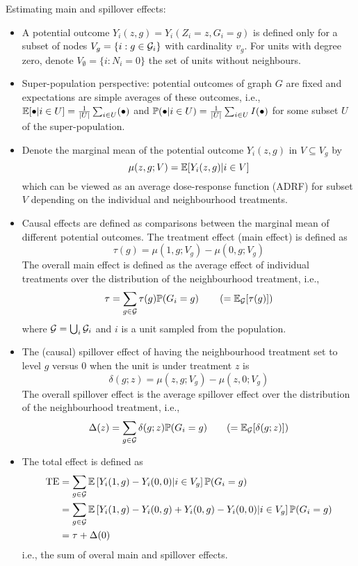 \documentclass[10pt]{article}
\begin{document}
Estimating main and spillover effects:

\begin{itemize}

\item
A potential outcome $Y_i(z,g)=Y_i(Z_i=z,G_i=g)$ is defined only for a subset of nodes $V_g=\{i:g\in\calG_i\}$ with cardinality $v_g$. For units with degree zero, denote $V_{\emptyset}=\{i:N_i=0\}$ the set of units without neighbours.

\item
Super-population perspective: potential outcomes of graph $G$ are fixed and expectations are simple averages of these outcomes, i.e., $\E[\bullet|i\in U]=\frac{1}{|U|}\sum_{i\in U}(\bullet)$ and $\P(\bullet|i\in U)=\frac{1}{|U|}\sum_{i\in U}I(\bullet)$ for some subset $U$ of the super-population.

\item
Denote the marginal mean of the potential outcome $Y_i(z,g)$ in $V\subseteq V_g$ by
\[
\mu(z,g;V) = \E[Y_i(z,g)|i\in V]
\]
which can be viewed as an average dose-response function (ADRF) for subset $V$ depending on the individual and neighbourhood treatments.

\item
Causal effects are defined as comparisons between the marginal mean of different potential outcomes. The treatment effect (main effect) is defined as
\[
\tau(g) = \mu(1,g;V_g) - \mu(0,g;V_g)
\]
The overall main effect is defined as the average effect of individual treatments over the distribution of the neighbourhood treatment, i.e.,
\[
\tau = \sum_{g\in\calG}\tau(g)\P(G_i=g) \qquad\left( = \E_\calG[\tau(g)]\right)
\]
where $\calG=\bigcup_i\calG_i$ and $i$ is a unit sampled from the population.

\item
The (causal) spillover effect of having the neighbourhood treatment set to level $g$ versus 0 when the unit is under treatment $z$ is
\[
\delta(g;z) = \mu(z,g;V_g) - \mu(z,0;V_g)
\]
The overall spillover effect is the average spillover effect over the distribution of the neighbourhood treatment, i.e.,
\[
\Delta(z) = \sum_{g\in\calG} \delta(g;z)\P(G_i=g) \qquad (=\E_\calG[\delta(g;z)])
\]

\item
The total effect is defined as
\begin{align*}
\text{TE} &= \sum_{g\in\calG}\E\left[Y_i(1,g)-Y_i(0,0)|i\in V_g\right]\P(G_i=g) \\
&= \sum_{g\in\calG}\E\left[Y_i(1,g)-Y_i(0,g)+Y_i(0,g)-Y_i(0,0)|i\in V_g\right]\P(G_i=g) \\
&= \tau + \Delta(0)
\end{align*}
i.e., the sum of overal main and spillover effects.

\end{itemize}
\end{document}
